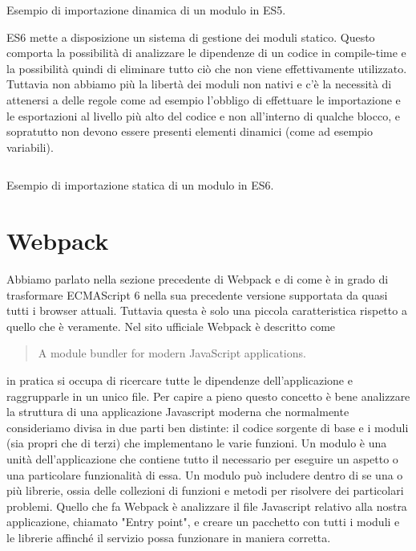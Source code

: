 \begin{listing}[ht]
\inputminted{Javascript}{sources/exampleDynamicImportES5.js}
\caption{Esempio di importazione dinamica di un modulo in ES5.} 
\end{listing}

\noindent
ES6 mette a disposizione un sistema di gestione dei moduli statico. Questo comporta la possibilità di analizzare le dipendenze di un codice in compile-time e la possibilità quindi di eliminare tutto ciò che non viene effettivamente utilizzato.
Tuttavia non abbiamo più la libertà dei moduli non nativi e c'è la necessità di attenersi a delle regole come ad esempio l'obbligo di effettuare le importazione e le esportazioni al livello più alto del codice e non all'interno di qualche blocco, e sopratutto non devono essere presenti elementi dinamici (come ad esempio variabili).

\begin{listing}[ht]
\inputminted{Javascript}{sources/exampleImportExportES6.js}
\caption{Esempio di importazione statica di un modulo in ES6.}  
\end{listing}


\section{Webpack}
Abbiamo parlato nella sezione precedente di Webpack e di come è in grado di trasformare ECMAScript 6 nella sua precedente versione supportata da quasi tutti i browser attuali. Tuttavia questa è solo una piccola caratteristica rispetto a quello che è veramente.
Nel sito ufficiale Webpack è descritto come \blockquote{A module bundler for modern JavaScript applications.} in pratica si occupa di ricercare tutte le dipendenze dell'applicazione e raggrupparle in un unico file. 
Per capire a pieno questo concetto è bene analizzare la struttura di una applicazione Javascript moderna che normalmente consideriamo divisa in due parti ben distinte: il codice sorgente di base e i moduli (sia propri che di terzi) che implementano le varie funzioni. Un modulo è una unità dell'applicazione che contiene tutto il necessario per eseguire un aspetto o una particolare funzionalità di essa. Un modulo può includere dentro di se una o più librerie, ossia delle collezioni di funzioni e metodi per risolvere dei particolari problemi. Quello che fa Webpack è analizzare il file Javascript relativo alla nostra applicazione, chiamato "Entry point", e creare un pacchetto con tutti i moduli e le librerie affinché il servizio possa funzionare in maniera corretta. 


